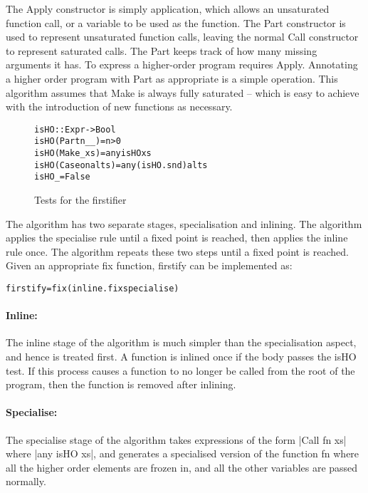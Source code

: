 \documentclass[preprint]{sigplanconf}
\newcommand{\C}[1]{\textsf{#1}}
\newenvironment{code}{\begin{alltt}\small}{\end{alltt}}
\begin{document}
The \C{Apply} constructor is simply application, which allows an unsaturated function call, or a variable to be used as the function. The \C{Part} constructor is used to represent unsaturated function calls, leaving the normal \C{Call} constructor to represent saturated calls. The \C{Part} keeps track of how many missing arguments it has. To express a higher-order program requires \C{Apply}. Annotating a higher order program with \C{Part} as appropriate is a simple operation. This algorithm assumes that \C{Make} is always fully saturated -- which is easy to achieve with the introduction of new functions as necessary.

\begin{figure}
\begin{code}
isHO :: Expr -> Bool
isHO (Part n _ _)    = n > 0
isHO (Make _ xs)     = any isHO xs
isHO (Case on alts)  = any (isHO . snd) alts
isHO _               = False
\end{code}
\caption{Tests for the firstifier}
\label{fig:firstify}
\end{figure}

The algorithm has two separate stages, specialisation and inlining. The algorithm applies the specialise rule until a fixed point is reached, then applies the inline rule once. The algorithm repeats these two steps until a fixed point is reached. Given an appropriate \C{fix} function, \C{firstify} can be implemented as:

\begin{code}
firstify = fix (inline . fix specialise)
\end{code}

\paragraph{Inline:} The \C{inline} stage of the algorithm is much simpler than the specialisation aspect, and hence is treated first. A function is inlined once if the body passes the \C{isHO} test. If this process causes a function to no longer be called from the root of the program, then the function is removed after inlining.

\paragraph{Specialise:} The \C{specialise} stage of the algorithm takes expressions of the form |Call fn xs| where |any isHO xs|, and generates a specialised version of the function \C{fn} where all the higher order elements are frozen in, and all the other variables are passed normally.
\end{document}
